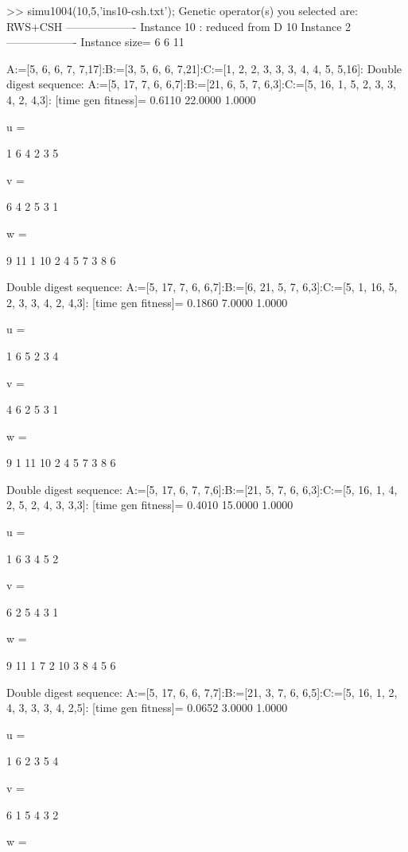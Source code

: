 >> simu1004(10,5,'ins10-csh.txt');
Genetic operator(s) you selected are:
RWS+CSH
------------------- Instance 10 : reduced from D 10 Instance 2 -------------------
Instance size=
     6     6    11

A:=[5, 6, 6, 7, 7,17]:B:=[3, 5, 6, 6, 7,21]:C:=[1, 2, 2, 3, 3, 3, 4, 4, 5, 5,16]:
Double digest sequence:
A:=[5, 17, 7, 6, 6,7]:B:=[21, 6, 5, 7, 6,3]:C:=[5, 16, 1, 5, 2, 3, 3, 4, 2, 4,3]:
[time gen fitness]=
    0.6110   22.0000    1.0000


u =

     1     6     4     2     3     5


v =

     6     4     2     5     3     1


w =

     9    11     1    10     2     4     5     7     3     8     6

Double digest sequence:
A:=[5, 17, 7, 6, 6,7]:B:=[6, 21, 5, 7, 6,3]:C:=[5, 1, 16, 5, 2, 3, 3, 4, 2, 4,3]:
[time gen fitness]=
    0.1860    7.0000    1.0000


u =

     1     6     5     2     3     4


v =

     4     6     2     5     3     1


w =

     9     1    11    10     2     4     5     7     3     8     6

Double digest sequence:
A:=[5, 17, 6, 7, 7,6]:B:=[21, 5, 7, 6, 6,3]:C:=[5, 16, 1, 4, 2, 5, 2, 4, 3, 3,3]:
[time gen fitness]=
    0.4010   15.0000    1.0000


u =

     1     6     3     4     5     2


v =

     6     2     5     4     3     1


w =

     9    11     1     7     2    10     3     8     4     5     6

Double digest sequence:
A:=[5, 17, 6, 6, 7,7]:B:=[21, 3, 7, 6, 6,5]:C:=[5, 16, 1, 2, 4, 3, 3, 3, 4, 2,5]:
[time gen fitness]=
    0.0652    3.0000    1.0000


u =

     1     6     2     3     5     4


v =

     6     1     5     4     3     2


w =


